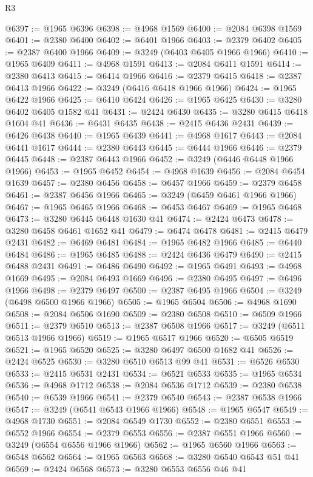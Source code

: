 \begin{lexlean}{R3}
\begin{coremodule}
@6397 := @1965 @6396
@6398 := @4968 @1569
@6400 := @2084 @6398 @1569
@6401 := @2380 @6400
@6402 := @6401 @1966
@6403 := @2379 @6402
@6405 := @2387 @6400 @1966
@6409 := @3249 (@6403 @6405 @1966 @1966)
@6410 := @1965 @6409
@6411 := @4968 @1591
@6413 := @2084 @6411 @1591
@6414 := @2380 @6413
@6415 := @6414 @1966
@6416 := @2379 @6415
@6418 := @2387 @6413 @1966
@6422 := @3249 (@6416 @6418 @1966 @1966)
@6424 := @1965 @6422 @1966
@6425 := @6410 @6424
@6426 := @1965 @6425
@6430 := @3280 @6402 @6405 @1582 @41
@6431 := @2424 @6430
@6435 := @3280 @6415 @6418 @1604 @41
@6436 := @6431 @6435
@6438 := @2415 @6436 @2431
@6439 := @6426 @6438
@6440 := @1965 @6439
@6441 := @4968 @1617
@6443 := @2084 @6441 @1617
@6444 := @2380 @6443
@6445 := @6444 @1966
@6446 := @2379 @6445
@6448 := @2387 @6443 @1966
@6452 := @3249 (@6446 @6448 @1966 @1966)
@6453 := @1965 @6452
@6454 := @4968 @1639
@6456 := @2084 @6454 @1639
@6457 := @2380 @6456
@6458 := @6457 @1966
@6459 := @2379 @6458
@6461 := @2387 @6456 @1966
@6465 := @3249 (@6459 @6461 @1966 @1966)
@6467 := @1965 @6465 @1966
@6468 := @6453 @6467
@6469 := @1965 @6468
@6473 := @3280 @6445 @6448 @1630 @41
@6474 := @2424 @6473
@6478 := @3280 @6458 @6461 @1652 @41
@6479 := @6474 @6478
@6481 := @2415 @6479 @2431
@6482 := @6469 @6481
@6484 := @1965 @6482 @1966
@6485 := @6440 @6484
@6486 := @1965 @6485
@6488 := @2424 @6436 @6479
@6490 := @2415 @6488 @2431
@6491 := @6486 @6490
@6492 := @1965 @6491
@6493 := @4968 @1669
@6495 := @2084 @6493 @1669
@6496 := @2380 @6495
@6497 := @6496 @1966
@6498 := @2379 @6497
@6500 := @2387 @6495 @1966
@6504 := @3249 (@6498 @6500 @1966 @1966)
@6505 := @1965 @6504
@6506 := @4968 @1690
@6508 := @2084 @6506 @1690
@6509 := @2380 @6508
@6510 := @6509 @1966
@6511 := @2379 @6510
@6513 := @2387 @6508 @1966
@6517 := @3249 (@6511 @6513 @1966 @1966)
@6519 := @1965 @6517 @1966
@6520 := @6505 @6519
@6521 := @1965 @6520
@6525 := @3280 @6497 @6500 @1682 @41
@6526 := @2424 @6525
@6530 := @3280 @6510 @6513 @99 @41
@6531 := @6526 @6530
@6533 := @2415 @6531 @2431
@6534 := @6521 @6533
@6535 := @1965 @6534
@6536 := @4968 @1712
@6538 := @2084 @6536 @1712
@6539 := @2380 @6538
@6540 := @6539 @1966
@6541 := @2379 @6540
@6543 := @2387 @6538 @1966
@6547 := @3249 (@6541 @6543 @1966 @1966)
@6548 := @1965 @6547
@6549 := @4968 @1730
@6551 := @2084 @6549 @1730
@6552 := @2380 @6551
@6553 := @6552 @1966
@6554 := @2379 @6553
@6556 := @2387 @6551 @1966
@6560 := @3249 (@6554 @6556 @1966 @1966)
@6562 := @1965 @6560 @1966
@6563 := @6548 @6562
@6564 := @1965 @6563
@6568 := @3280 @6540 @6543 @51 @41
@6569 := @2424 @6568
@6573 := @3280 @6553 @6556 @46 @41

\end{coremodule}
\end{lexlean}
